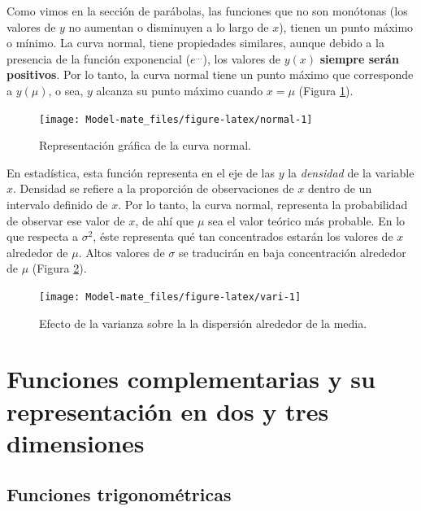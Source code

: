 \documentclass[
]{book}
\begin{document}
Como vimos en la sección de parábolas, las funciones que no son monótonas (los valores de \(y\) no aumentan o disminuyen a lo largo de \(x\)), tienen un punto máximo o mínimo. La curva normal, tiene propiedades similares, aunque debido a la presencia de la función exponencial (\(e^{\dots}\)), los valores de \(y(x)\) \textbf{siempre serán positivos}. Por lo tanto, la curva normal tiene un punto máximo que corresponde a \(y(\mu)\), o sea, \(y\) alcanza su punto máximo cuando \(x=\mu\) (Figura \ref{fig:normal}).

\begin{figure}

{\centering \texttt{[image: Model-mate\_files/figure-latex/normal-1]} 

}

\caption{Representación gráfica de la curva normal.}\label{fig:normal}
\end{figure}

En estadística, esta función representa en el eje de las \(y\) la \emph{densidad} de la variable \(x\). Densidad se refiere a la proporción de observaciones de \(x\) dentro de un intervalo definido de \(x\). Por lo tanto, la curva normal, representa la probabilidad de observar ese valor de \(x\), de ahí que \(\mu\) sea el valor teórico más probable. En lo que respecta a \(\sigma^2\), éste representa qué tan concentrados estarán los valores de \(x\) alrededor de \(\mu\). Altos valores de \(\sigma\) se traducirán en baja concentración alrededor de \(\mu\) (Figura \ref{fig:vari}).

\begin{figure}

{\centering \texttt{[image: Model-mate\_files/figure-latex/vari-1]} 

}

\caption{Efecto de  la varianza sobre la la dispersión alrededor de la media.}\label{fig:vari}
\end{figure}

\hypertarget{funciones-complementarias-y-su-representaciuxf3n-en-dos-y-tres-dimensiones}{%
\section{Funciones complementarias y su representación en dos y tres dimensiones}\label{funciones-complementarias-y-su-representaciuxf3n-en-dos-y-tres-dimensiones}}

\hypertarget{funciones-trigonomuxe9tricas}{%
\subsection{Funciones trigonométricas}\label{funciones-trigonomuxe9tricas}}
\end{document}
